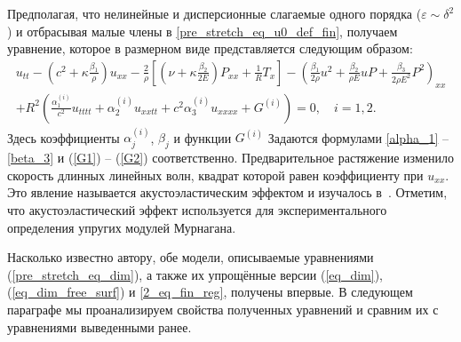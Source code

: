 \documentclass[12pt, a4paper]{report}
\begin{document}
Предполагая, что нелинейные и дисперсионные слагаемые одного порядка ($\varepsilon \sim \delta^2$) и отбрасывая малые члены в \eqref{pre_stretch_eq_u0_def_fin}, получаем уравнение, которое в размерном виде представляется следующим образом:
\begin{equation}\label{pre_stretch_eq_dim}
\begin{split}
u_{tt} - \left(c^2 + \kappa\frac{\beta_1}{\rho}\right) u_{xx} - \frac{2}{\rho}\left[\left(\nu + \kappa \frac{\beta_2}{2E} \right) P_{xx} + \frac1R T_x\right] - \left(\frac{\beta_1}{2\rho} u^2 + \frac{\beta_2}{\rho E} u P + \frac{\beta_3}{2\rho E^2} P^2\right)_{xx}\\
+ R^2 \left(\frac{\alpha_1^{(i)}}{c^2} u_{tttt} + \alpha_2^{(i)} u_{xxtt} + c^2\alpha_3^{(i)} u_{xxxx} + G^{(i)} \right) = 0, \quad i = 1,2.
\end{split}
\end{equation}
Здесь коэффициенты $\alpha_j^{(i)}$, $\beta_j$ и функции $G^{(i)}$ Задаются формулами \eqref{alpha_1} -- \eqref{beta_3} и (\ref{G1}) -- (\ref{G2}) соответственно.
Предварительное растяжение изменило скорость длинных линейных волн, квадрат которой равен коэффициенту при $u_{xx}$. 
Это явление называется акустоэластическим эффектом и изучалось в~\cite{HughesKelly, ADO}. Отметим, что акустоэластический эффект используется для экспериментального определения упругих модулей Мурнагана.

Насколько известно автору, обе модели, описываемые уравнениями (\ref{pre_stretch_eq_dim}), а также их упрощённые версии (\ref{eq_dim}), (\ref{eq_dim_free_surf}) и \eqref{2_eq_fin_reg}, получены впервые. В следующем параграфе мы проанализируем свойства полученных уравнений и сравним их с уравнениями выведенными ранее.
\end{document}
